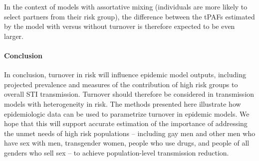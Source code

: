 In the context of models with assortative mixing
(individuals are more likely to select partners from their risk group),
the difference between the tPAFs estimated by the model
with versus without turnover is therefore expected to be even larger.

\paragraph{Conclusion}
In conclusion, turnover in risk will influence
epidemic model outputs, including projected prevalence and
measures of the contribution of high risk groups to overall STI transmission.
Turnover should therefore be considered in
transmission models with heterogeneity in risk.
The methods presented here illustrate how
epidemiologic data can be used to parametrize
turnover in epidemic models.
We hope that this will support accurate estimation of
the importance of addressing the unmet needs of high risk populations
-- including
gay men and other men who have sex with men,
transgender women,
people who use drugs, and
people of all genders who sell sex
-- to achieve population-level transmission reduction.